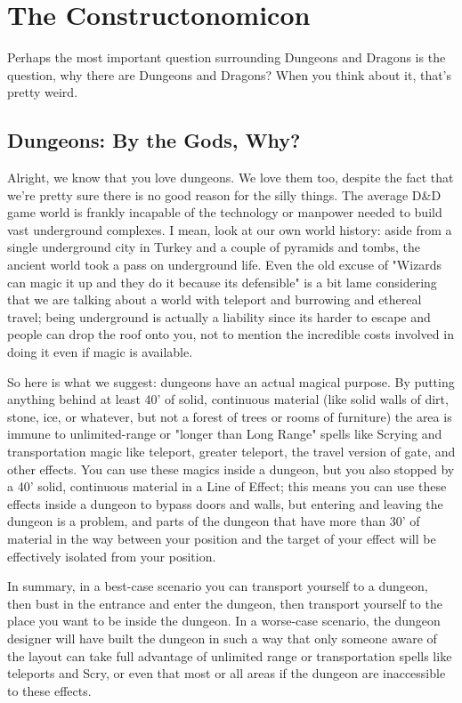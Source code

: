 \section{The Constructonomicon}
\vspace*{-10pt}

Perhaps the most important question surrounding Dungeons and Dragons is the question, why there are Dungeons and Dragons? When you think about it, that's pretty weird.

\subsection{Dungeons: By the Gods, Why?}

Alright, we know that you love dungeons. We love them too, despite the fact that we're pretty sure there is no good reason for the silly things. The average D\&D game world is frankly incapable of the technology or manpower needed to build vast underground complexes. I mean, look at our own world history: aside from a single underground city in Turkey and a couple of pyramids and tombs, the ancient world took a pass on underground life. Even the old excuse of "Wizards can magic it up and they do it because its defensible" is a bit lame considering that we are talking about a world with teleport and burrowing and ethereal travel; being underground is actually a liability since its harder to escape and people can drop the roof onto you, not to mention the incredible costs involved in doing it even if magic is available.

So here is what we suggest: dungeons have an actual magical purpose. By putting anything behind at least 40' of solid, continuous material (like solid walls of dirt, stone, ice, or whatever, but not a forest of trees or rooms of furniture) the area is immune to unlimited-range or "longer than Long Range" spells like Scrying and transportation magic like teleport, greater teleport, the travel version of gate, and other effects. You can use these magics inside a dungeon, but you also stopped by a 40' solid, continuous material in a Line of Effect; this means you can use these effects inside a dungeon to bypass doors and walls, but entering and leaving the dungeon is a problem, and parts of the dungeon that have more than 30' of material in the way between your position and the target of your effect will be effectively isolated from your position.

In summary, in a best-case scenario you can transport yourself to a dungeon, then bust in the entrance and enter the dungeon, then transport yourself to the place you want to be inside the dungeon. In a worse-case scenario, the dungeon designer will have built the dungeon in such a way that only someone aware of the layout can take full advantage of unlimited range or transportation spells like teleports and Scry, or even that most or all areas if the dungeon are inaccessible to these effects.


